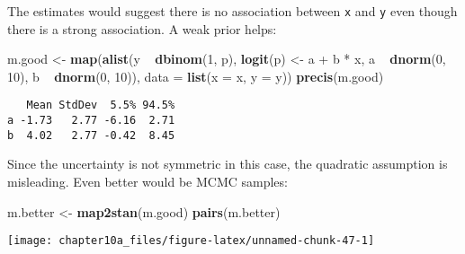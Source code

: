 \documentclass[]{tufte-handout}
\newenvironment{Shaded}{}{}
\newcommand{\KeywordTok}[1]{\textcolor[rgb]{0.00,0.44,0.13}{\textbf{#1}}}
\newcommand{\DataTypeTok}[1]{\textcolor[rgb]{0.56,0.13,0.00}{#1}}
\newcommand{\DecValTok}[1]{\textcolor[rgb]{0.25,0.63,0.44}{#1}}
\newcommand{\StringTok}[1]{\textcolor[rgb]{0.25,0.44,0.63}{#1}}
\newcommand{\OperatorTok}[1]{\textcolor[rgb]{0.40,0.40,0.40}{#1}}
\newcommand{\NormalTok}[1]{#1}
\begin{document}
The estimates would suggest there is no association between \texttt{x}
and \texttt{y} even though there is a strong association. A weak prior
helps:

\begin{Shaded}
\begin{Highlighting}[]
\NormalTok{m.good <-}\StringTok{ }\KeywordTok{map}\NormalTok{(}\KeywordTok{alist}\NormalTok{(y }\OperatorTok{~}\StringTok{ }\KeywordTok{dbinom}\NormalTok{(}\DecValTok{1}\NormalTok{, p), }\KeywordTok{logit}\NormalTok{(p) <-}\StringTok{ }\NormalTok{a }\OperatorTok{+}\StringTok{ }
\StringTok{    }\NormalTok{b }\OperatorTok{*}\StringTok{ }\NormalTok{x, a }\OperatorTok{~}\StringTok{ }\KeywordTok{dnorm}\NormalTok{(}\DecValTok{0}\NormalTok{, }\DecValTok{10}\NormalTok{), b }\OperatorTok{~}\StringTok{ }\KeywordTok{dnorm}\NormalTok{(}\DecValTok{0}\NormalTok{, }\DecValTok{10}\NormalTok{)), }
    \DataTypeTok{data =} \KeywordTok{list}\NormalTok{(}\DataTypeTok{x =}\NormalTok{ x, }\DataTypeTok{y =}\NormalTok{ y))}
\KeywordTok{precis}\NormalTok{(m.good)}
\end{Highlighting}
\end{Shaded}

\begin{verbatim}
   Mean StdDev  5.5% 94.5%
a -1.73   2.77 -6.16  2.71
b  4.02   2.77 -0.42  8.45
\end{verbatim}

Since the uncertainty is not symmetric in this case, the quadratic
assumption is misleading. Even better would be MCMC samples:

\begin{Shaded}
\begin{Highlighting}[]
\NormalTok{m.better <-}\StringTok{ }\KeywordTok{map2stan}\NormalTok{(m.good)}
\KeywordTok{pairs}\NormalTok{(m.better)}
\end{Highlighting}
\end{Shaded}

\texttt{[image: chapter10a\_files/figure-latex/unnamed-chunk-47-1]}
\end{document}
